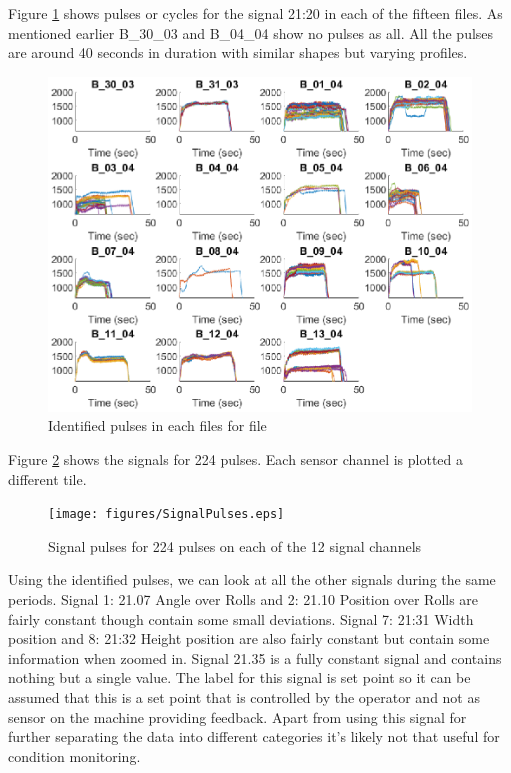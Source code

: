 \documentclass{article}
\begin{document}
Figure \ref{fig:IdentifiedPulses} shows pulses or cycles for the signal 21:20 in each of the fifteen files. As mentioned earlier B\_30\_03 and B\_04\_04 show no pulses as all. All the pulses are around 40 seconds in duration with similar shapes but varying profiles.
 
\begin{figure}[H]
    \centering
    \includegraphics[width=\textwidth, height=\textheight, keepaspectratio]{figures/IdentifiedPulsesFig.eps}
    \caption{Identified pulses in each files for file}
    \label{fig:IdentifiedPulses}
\end{figure}

Figure \ref{fig:SignalPulses} shows the signals for 224 pulses. Each sensor channel is plotted a different tile. 
\begin{figure}[H]
    \centering
    \texttt{[image: figures/SignalPulses.eps]}
    \caption{Signal pulses for 224 pulses on each of the 12 signal channels}
    \label{fig:SignalPulses}
\end{figure}

Using the identified pulses, we can look at all the other signals during the same periods. Signal 1: 21.07 Angle over Rolls and 2: 21.10 Position over Rolls are fairly constant though contain some small deviations. Signal 7: 21:31 Width position and  8: 21:32 Height position are also fairly constant but contain some information when zoomed in. Signal 21.35 is a fully constant signal and contains nothing but a single value. The label for this signal is set point so it can be assumed that this is a set point that is controlled by the operator and not as sensor on the machine providing feedback. Apart from using this signal for further separating the data into different categories it's likely not that useful for condition monitoring.
\end{document}
